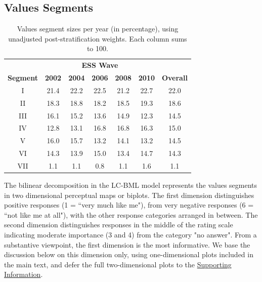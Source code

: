 \documentclass[12pt,letter]{article}\usepackage[]{graphicx}\usepackage[]{xcolor}
\begin{document}
\subsection*{Values Segments}

\begin{table}[ht]
\renewcommand{\arraystretch}{1.25}
\footnotesize
\centering
\begin{tabular}{ccccccc}
  \toprule
   & \multicolumn{5}{c}{\textbf{ESS Wave}} \\ \cmidrule{2-6}
 \textbf{Segment} & \textbf{2002} & \textbf{2004} & \textbf{2006} & \textbf{2008} & \textbf{2010} & \textbf{Overall} \\ 
  \midrule
  I & 21.4 & 22.2 & 22.5 & 21.2 & 22.7 & 22.0 \\ 
  II & 18.3 & 18.8 & 18.2 & 18.5 & 19.3 & 18.6 \\ 
  III & 16.1 & 15.2 & 13.6 & 14.9 & 12.3 & 14.5 \\ 
  IV & 12.8 & 13.1 & 16.8 & 16.8 & 16.3 & 15.0 \\ 
  V & 16.0 & 15.7 & 13.2 & 14.1 & 13.2 & 14.5 \\ 
  VI & 14.3 & 13.9 & 15.0 & 13.4 & 14.7 & 14.3 \\ 
  VII & \hphantom{6}1.1 & \hphantom{6}1.1 & \hphantom{6}0.8 & \hphantom{6}1.1 & \hphantom{6}1.6 & \hphantom{6}1.1 \\ 
   \bottomrule
\end{tabular}
\caption{Values segment sizes per year (in percentage), using unadjusted post-stratification weights. Each column sums to 100.} 
\label{T:segsizes_vs_yr}
\end{table}


The bilinear decomposition in the LC-BML model represents the values segments in two dimensional perceptual maps or biplots. The first dimension distinguishes positive responses (1 = ``very much like me"), from very negative responses (6 = ``not like me at all"), with the other response categories arranged in between. The second dimension distinguishes responses in the middle of the rating scale indicating moderate importance (3 and 4) from the category "no answer". From a substantive viewpoint, the first dimension is the most informative. We base the discussion below on this dimension only, using one-dimensional plots included in the main text, and defer the full two-dimensional plots to the \hyperref[S:App]{Supporting Information}.
\end{document}
